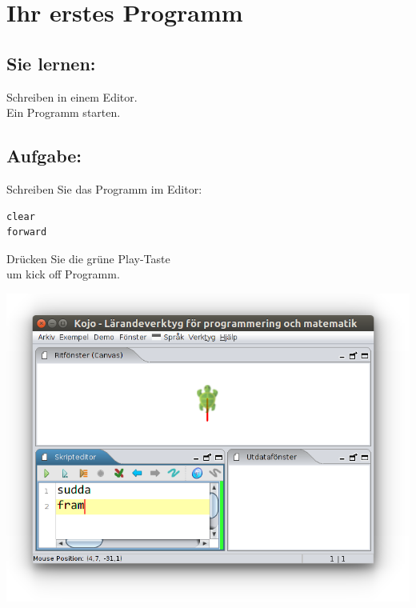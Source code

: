 \chapter{Ihr erstes Programm}
\begin{multicols}{2}
\section*{\color{MidnightBlue}Sie lernen:}
Schreiben in einem Editor.\\
Ein Programm starten.
\section*{\color{BrickRed}Aufgabe:}
Schreiben Sie das Programm im Editor:

\begin{lstlisting}[basicstyle={\ttfamily\fontsize{24}{24}\selectfont}]
clear
forward
\end{lstlisting}
        
Drücken Sie die grüne Play-Taste \\
 um kick off Programm.

\columnbreak

\includegraphics[width=14cm]{../img/fram.png}
\end{multicols}

